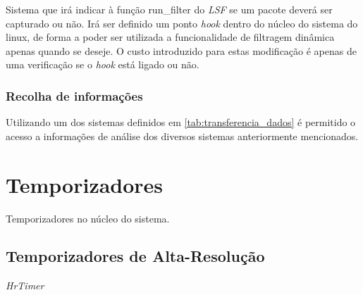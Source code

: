 Sistema que irá indicar à função run\_filter do \textit{LSF} se um pacote deverá
ser capturado ou não. Irá ser definido um ponto \textit{hook} dentro do núcleo
do sistema do linux, de forma a poder ser utilizada a funcionalidade de
filtragem dinâmica apenas quando se deseje. O custo introduzido para estas
modificação é apenas de uma verificação se o \textit{hook} está ligado ou não.


\subsubsection{Recolha de informações}

Utilizando um dos sistemas definidos em \ref{tab:transferencia_dados} é
permitido o acesso a informações de análise dos diversos sistemas anteriormente
mencionados.

\section{Temporizadores}

Temporizadores no núcleo do sistema.


\subsection{Temporizadores de Alta-Resolução}

\textit{HrTimer}

